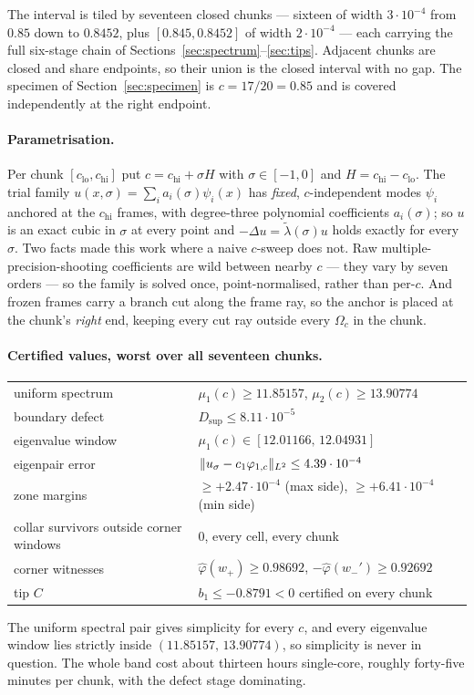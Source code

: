 \documentclass[11pt]{article}
\begin{document}
The interval is tiled by seventeen closed chunks --- sixteen of width
$3\cdot10^{-4}$ from $0.85$ down to $0.8452$, plus $[0.845,0.8452]$ of
width $2\cdot10^{-4}$ --- each carrying the full six-stage chain of
Sections~\ref{sec:spectrum}--\ref{sec:tips}. Adjacent chunks are closed
and share endpoints, so their union is the closed interval with no gap.
The specimen of Section~\ref{sec:specimen} is $c=17/20=0.85$ and is
covered independently at the right endpoint.

\paragraph{Parametrisation.} Per chunk $[c_{\mathrm{lo}},c_{\mathrm{hi}}]$
put $c=c_{\mathrm{hi}}+\sigma H$ with $\sigma\in[-1,0]$ and
$H=c_{\mathrm{hi}}-c_{\mathrm{lo}}$. The trial family
$u(x,\sigma)=\sum_i a_i(\sigma)\psi_i(x)$ has \emph{fixed},
$c$-independent modes $\psi_i$ anchored at the $c_{\mathrm{hi}}$ frames,
with degree-three polynomial coefficients $a_i(\sigma)$; so $u$ is an
exact cubic in $\sigma$ at every point and $-\Delta u=\tilde\lambda
(\sigma)u$ holds exactly for every $\sigma$. Two facts made this work
where a naive $c$-sweep does not. Raw multiple-precision-shooting
coefficients are wild between nearby $c$ --- they vary by seven orders
--- so the family is solved once, point-normalised, rather than
per-$c$. And frozen frames carry a branch cut along the frame ray, so
the anchor is placed at the chunk's \emph{right} end, keeping every cut
ray outside every $\Omega_c$ in the chunk.

\paragraph{Certified values, worst over all seventeen chunks.}
\begin{center}
\begin{tabular}{ll}
\toprule
uniform spectrum & $\mu_1(c)\ge 11.85157$, $\mu_2(c)\ge 13.90774$ \\
boundary defect & $D_{\sup}\le 8.11\cdot10^{-5}$ \\
eigenvalue window & $\mu_1(c)\in[12.01166,\,12.04931]$ \\
eigenpair error & $\lVert u_\sigma-c_1\varphi_{1,c} \rVert_{L^2}\le
4.39\cdot10^{-4}$ \\
zone margins & $\ge +2.47\cdot10^{-4}$ (max side),
$\ge +6.41\cdot10^{-4}$ (min side) \\
collar survivors outside corner windows & $0$, every cell, every chunk \\
corner witnesses & $\hat\varphi(w_+)\ge 0.98692$,
$-\hat\varphi(w_-')\ge 0.92692$ \\
tip $C$ & $b_1\le -0.8791<0$ certified on every chunk \\
\bottomrule
\end{tabular}
\end{center}
The uniform spectral pair gives simplicity for every $c$, and every
eigenvalue window lies strictly inside $(11.85157,\,13.90774)$, so
simplicity is never in question. The whole band cost about thirteen
hours single-core, roughly forty-five minutes per chunk, with the defect
stage dominating.
\end{document}
